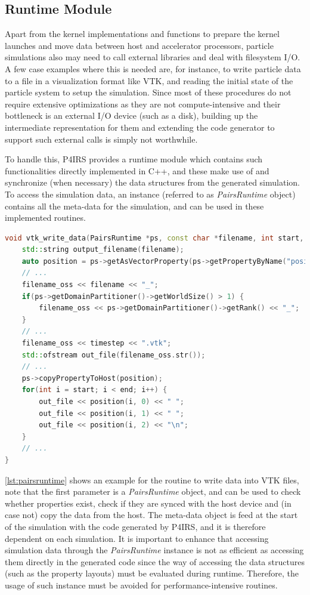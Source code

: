 \documentclass[preprint,12pt]{elsarticle}
\begin{document}
\subsection{Runtime Module}

Apart from the kernel implementations and functions to prepare the kernel launches and move data between host and accelerator processors, particle simulations also may need to call external libraries and deal with filesystem I/O.
A few case examples where this is needed are, for instance, to write particle data to a file in a visualization format like VTK, and reading the initial state of the particle system to setup the simulation.
Since most of these procedures do not require extensive optimizations as they are not compute-intensive and their bottleneck is an external I/O device (such as a disk), building up the intermediate representation for them and extending the code generator to support such external calls is simply not worthwhile.

To handle this, P4IRS provides a runtime module which contains such functionalities directly implemented in C++, and these make use of and synchronize (when necessary) the data structures from the generated simulation.
To access the simulation data, an instance (referred to as \emph{PairsRuntime} object) contains all the meta-data for the simulation, and can be used in these implemented routines.

\begin{lstlisting}[language=C++,
		   label={lst:pairsruntime},
	   	   caption={P4IRS runtime routine example for writing VTK data into a file.}]
void vtk_write_data(PairsRuntime *ps, const char *filename, int start, int end, int timestep) {
    std::string output_filename(filename);
    auto position = ps->getAsVectorProperty(ps->getPropertyByName("position"));
    // ...
    filename_oss << filename << "_";
    if(ps->getDomainPartitioner()->getWorldSize() > 1) {
        filename_oss << ps->getDomainPartitioner()->getRank() << "_";
    }
    // ...
    filename_oss << timestep << ".vtk";
    std::ofstream out_file(filename_oss.str());
    // ...
    ps->copyPropertyToHost(position);
    for(int i = start; i < end; i++) {
        out_file << position(i, 0) << " ";
        out_file << position(i, 1) << " ";
        out_file << position(i, 2) << "\n";
    }
    // ...
}
\end{lstlisting}

\autoref{lst:pairsruntime} shows an example for the routine to write data into VTK files, note that the first parameter is a \emph{PairsRuntime} object, and can be used to check whether properties exist, check if they are synced with the host device and (in case not) copy the data from the host.
The meta-data object is feed at the start of the simulation with the code generated by P4IRS, and it is therefore dependent on each simulation.
It is important to enhance that accessing simulation data through the \emph{PairsRuntime} instance is not as efficient as accessing them directly in the generated code since the way of accessing the data structures (such as the property layouts) must be evaluated during runtime.
Therefore, the usage of such instance must be avoided for performance-intensive routines.
\end{document}
